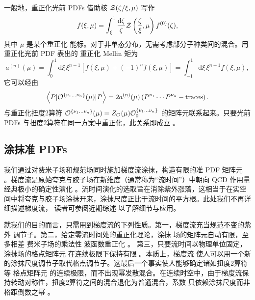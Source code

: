 一般地，重正化光前 PDFs 借助核 ${\cal Z}(\zeta/\xi,\mu)$ 写作
\begin{equation}
f(\xi,\mu) = \int_\xi^1 \frac{\mathrm{d}\zeta}{\zeta}{\cal
Z}\left(\frac{\zeta}{\xi},\mu\right)f^{(0)}(\zeta),
\end{equation}
其中 $\mu$ 是某个重正化
能标。对于非单态分布，无需考虑部分子种类间的混合。用重正化光前 PDF 表出的
重正化 Mellin 矩为
\begin{equation}
a^{(n)}(\mu) = \int_0^1 \mathrm{d}\xi\,\xi^{n-1}\left[
f(\xi,\mu)+(-1)^n\overline{f}(\xi,\mu)\right] = \int_{-1}^1
\mathrm{d}\xi\,\xi^{n-1}
f(\xi,\mu),
\end{equation}
它可以经由
\begin{equation}\label{eq:RopePDF}
\left\langle P | {\cal O}^{\{\nu_1\ldots \nu_n\}}(\mu) | P
\right\rangle = 2a^{(n)}(\mu) \left(P^{\nu_1}\cdots P^{\nu_n} -
\mathrm{traces}\right).
\end{equation}
与重正化扭度2算符
${\cal O}^{\{\nu_1\ldots \nu_n\}}(\mu) =Z_{\cal O}(\mu){\cal
O}_0^{\{\nu_1\ldots \nu_n\}}$ 的矩阵元联系起来。只要光前 PDFs 与扭度2算符在同一方案中重正化，此关系即成立 \cite{Collins:1981uw}。



\subsection{涂抹准 PDFs}

我们通过对费米子场和规范场同时施加梯度流涂抹，构造有限的准 PDF 矩阵元
\cite{Narayanan:2006rf,Luscher:2011bx,Luscher:2013cpa}。梯度流是原始夸克与胶子场在新维度（通常称为“流时间”）中朝向 QCD 作用量经典极小的确定性演化 \cite{Luscher:2011bx,Luscher:2013cpa}。流时间演化的选取旨在消除紫外涨落，这相当于在实空间中将夸克与胶子场涂抹开来，涂抹尺度正比于流时间的平方根。此处我们不再详细描述梯度流，
读者可参阅近期综述
\cite{Luscher:2013vga,Ramos:2015dla} 以了解细节与应用。

就我们的目的而言，只需用到梯度流的下列性质。第一，梯度流充当规范不变的紫外
调节子。第二，给定零流时间处的重正化理论，涂抹
场的矩阵元自动有限，至多相差
费米子场的乘法性
波函数重正化 \cite{Makino:2014taa,Hieda:2016lly}。
第三，只要流时间以物理单位固定，涂抹场的格点矩阵元
在连续极限下保持有限 \cite{Luscher:2013cpa,Monahan:2015lha}。本质上，梯度流
使人可以用一个新的涂抹尺度调节子取代格点调节子。这最后一个事实使人能够确定诸如扭度2算符等
格点矩阵元
的连续极限，而不出现幂发散混合。在连续时空中，由于梯度流保持转动对称性，扭度2算符之间的混合退化为普通混合，系数
只依赖涂抹尺度而非格距倒数之幂
\cite{Monahan:2015lha}。

